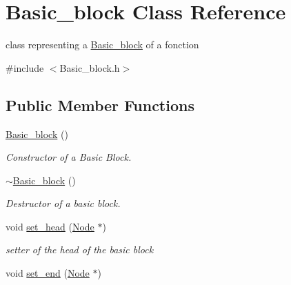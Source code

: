\hypertarget{classBasic__block}{
\section{Basic\_\-block Class Reference}
\label{classBasic__block}
}


class representing a \hyperlink{classBasic__block}{Basic\_\-block} of a fonction  


{\ttfamily \#include $<$Basic\_\-block.h$>$}\subsection*{Public Member Functions}
\begin{DoxyCompactItemize}
\item 
\hypertarget{classBasic__block_aa2455e1b1b8f5ac9b1c128f121fe3d67}{
\hyperlink{classBasic__block_aa2455e1b1b8f5ac9b1c128f121fe3d67}{Basic\_\-block} ()}
\label{classBasic__block_aa2455e1b1b8f5ac9b1c128f121fe3d67}

\begin{DoxyCompactList}\small\item\em Constructor of a Basic Block. \item\end{DoxyCompactList}\item 
\hypertarget{classBasic__block_a0047b58d9a30fa6eb79a87c70e9176d0}{
\hyperlink{classBasic__block_a0047b58d9a30fa6eb79a87c70e9176d0}{$\sim$Basic\_\-block} ()}
\label{classBasic__block_a0047b58d9a30fa6eb79a87c70e9176d0}

\begin{DoxyCompactList}\small\item\em Destructor of a basic block. \item\end{DoxyCompactList}\item 
\hypertarget{classBasic__block_a1fa279bf9b2750ba0042b1fe87e5c343}{
void \hyperlink{classBasic__block_a1fa279bf9b2750ba0042b1fe87e5c343}{set\_\-head} (\hyperlink{classNode}{Node} $\ast$)}
\label{classBasic__block_a1fa279bf9b2750ba0042b1fe87e5c343}

\begin{DoxyCompactList}\small\item\em setter of the head of the basic block \item\end{DoxyCompactList}\item 
\hypertarget{classBasic__block_aebf407fc956b148ef145b0a6233d0361}{
void \hyperlink{classBasic__block_aebf407fc956b148ef145b0a6233d0361}{set\_\-end} (\hyperlink{classNode}{Node} $\ast$)}
\label{classBasic__block_aebf407fc956b148ef145b0a6233d0361}


\end{DoxyCompactItemize}
